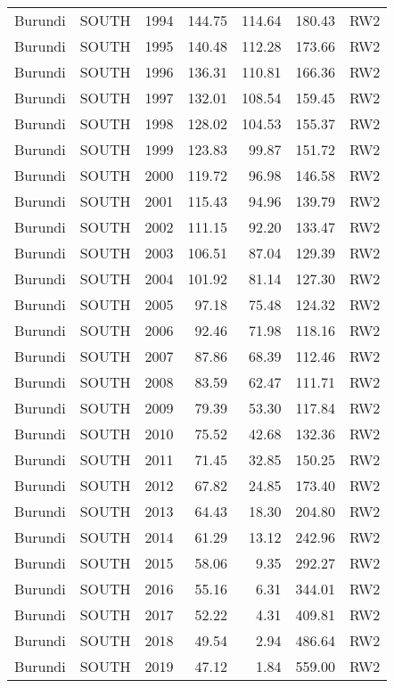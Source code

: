 \begin{longtable}{lllrrrl}
  Burundi & SOUTH & 1994 & 144.75 & 114.64 & 180.43 & RW2 \\ 
  Burundi & SOUTH & 1995 & 140.48 & 112.28 & 173.66 & RW2 \\ 
  Burundi & SOUTH & 1996 & 136.31 & 110.81 & 166.36 & RW2 \\ 
  Burundi & SOUTH & 1997 & 132.01 & 108.54 & 159.45 & RW2 \\ 
  Burundi & SOUTH & 1998 & 128.02 & 104.53 & 155.37 & RW2 \\ 
  Burundi & SOUTH & 1999 & 123.83 & 99.87 & 151.72 & RW2 \\ 
  Burundi & SOUTH & 2000 & 119.72 & 96.98 & 146.58 & RW2 \\ 
  Burundi & SOUTH & 2001 & 115.43 & 94.96 & 139.79 & RW2 \\ 
  Burundi & SOUTH & 2002 & 111.15 & 92.20 & 133.47 & RW2 \\ 
  Burundi & SOUTH & 2003 & 106.51 & 87.04 & 129.39 & RW2 \\ 
  Burundi & SOUTH & 2004 & 101.92 & 81.14 & 127.30 & RW2 \\ 
  Burundi & SOUTH & 2005 & 97.18 & 75.48 & 124.32 & RW2 \\ 
  Burundi & SOUTH & 2006 & 92.46 & 71.98 & 118.16 & RW2 \\ 
  Burundi & SOUTH & 2007 & 87.86 & 68.39 & 112.46 & RW2 \\ 
  Burundi & SOUTH & 2008 & 83.59 & 62.47 & 111.71 & RW2 \\ 
  Burundi & SOUTH & 2009 & 79.39 & 53.30 & 117.84 & RW2 \\ 
  Burundi & SOUTH & 2010 & 75.52 & 42.68 & 132.36 & RW2 \\ 
  Burundi & SOUTH & 2011 & 71.45 & 32.85 & 150.25 & RW2 \\ 
  Burundi & SOUTH & 2012 & 67.82 & 24.85 & 173.40 & RW2 \\ 
  Burundi & SOUTH & 2013 & 64.43 & 18.30 & 204.80 & RW2 \\ 
  Burundi & SOUTH & 2014 & 61.29 & 13.12 & 242.96 & RW2 \\ 
  Burundi & SOUTH & 2015 & 58.06 & 9.35 & 292.27 & RW2 \\ 
  Burundi & SOUTH & 2016 & 55.16 & 6.31 & 344.01 & RW2 \\ 
  Burundi & SOUTH & 2017 & 52.22 & 4.31 & 409.81 & RW2 \\ 
  Burundi & SOUTH & 2018 & 49.54 & 2.94 & 486.64 & RW2 \\ 
  Burundi & SOUTH & 2019 & 47.12 & 1.84 & 559.00 & RW2 \\ 

\end{longtable}
